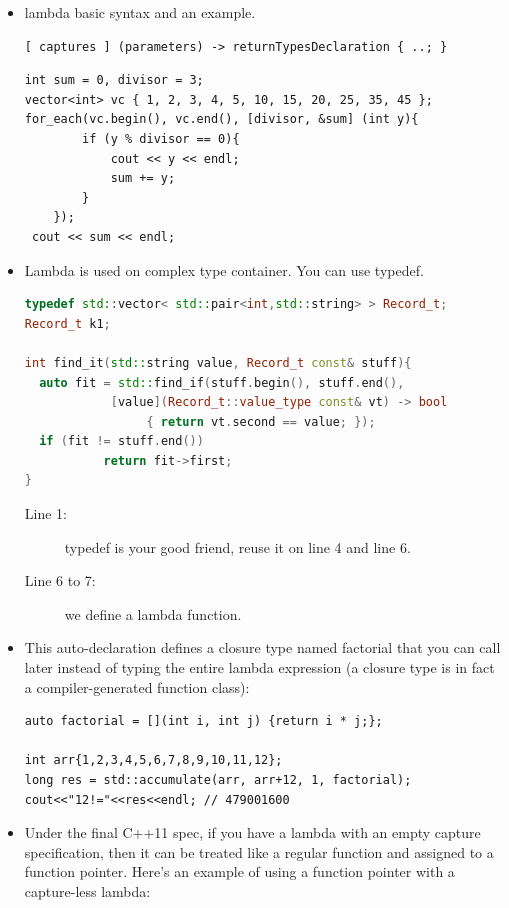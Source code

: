 \documentclass[a4paper,11pt,twoside]{book}
\begin{document}
\begin{itemize}
		\item lambda basic syntax and an example.

\begin{lstlisting}
[ captures ] (parameters) -> returnTypesDeclaration { ..; }
\end{lstlisting}

\begin{lstlisting}
int sum = 0, divisor = 3;
vector<int> vc { 1, 2, 3, 4, 5, 10, 15, 20, 25, 35, 45 };
for_each(vc.begin(), vc.end(), [divisor, &sum] (int y){
		if (y % divisor == 0){
			cout << y << endl;
			sum += y;
		}
	});
 cout << sum << endl;
\end{lstlisting}

		\item Lambda is used on complex type container. You can use typedef.
\begin{lstlisting}[frame=single, language=c++, mathescape=true]
typedef std::vector< std::pair<int,std::string> > Record_t;
Record_t k1;

int find_it(std::string value, Record_t const& stuff){
  auto fit = std::find_if(stuff.begin(), stuff.end(),
            [value](Record_t::value_type const& vt) -> bool
                 { return vt.second == value; });
  if (fit != stuff.end())
           return fit->first;
}
\end{lstlisting}

\begin{description}
	\item[Line 1:] typedef is your good friend, reuse it on line 4 and line 6.
	\item[Line 6 to 7:] we define a lambda function.
\end{description}

		\item This auto-declaration defines a closure type named factorial that you can call later instead of typing the entire lambda expression (a closure type is in fact a compiler-generated function class):
\begin{lstlisting}[numbers=none]
auto factorial = [](int i, int j) {return i * j;};

int arr{1,2,3,4,5,6,7,8,9,10,11,12};
long res = std::accumulate(arr, arr+12, 1, factorial);
cout<<"12!="<<res<<endl; // 479001600
\end{lstlisting}

		\item Under the final C++11 spec, if you have a lambda with an empty capture specification, then it can be treated like a regular function and assigned to a function pointer. Here's an example of using a function pointer with a capture-less lambda:


\end{itemize}
\end{document}
